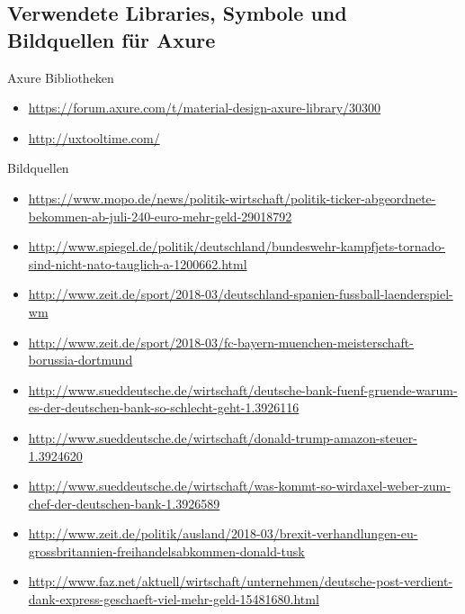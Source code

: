 \subsection{Verwendete Libraries, Symbole und Bildquellen für Axure}

Axure Bibliotheken

\begin{itemize}
  \sloppy

  \item \url{https://forum.axure.com/t/material-design-axure-library/30300}
  \item \url{http://uxtooltime.com/}

\end{itemize}

Bildquellen

\begin{itemize}
  \sloppy

  \item \url{https://www.mopo.de/news/politik-wirtschaft/politik-ticker-abgeordnete-bekommen-ab-juli-240-euro-mehr-geld-29018792}
  \item \url{http://www.spiegel.de/politik/deutschland/bundeswehr-kampfjets-tornado-sind-nicht-nato-tauglich-a-1200662.html}
  \item \url{http://www.zeit.de/sport/2018-03/deutschland-spanien-fussball-laenderspiel-wm}
  \item \url{http://www.zeit.de/sport/2018-03/fc-bayern-muenchen-meisterschaft-borussia-dortmund}
  \item \url{http://www.sueddeutsche.de/wirtschaft/deutsche-bank-fuenf-gruende-warum-es-der-deutschen-bank-so-schlecht-geht-1.3926116}
  \item \url{http://www.sueddeutsche.de/wirtschaft/donald-trump-amazon-steuer-1.3924620}
  \item \url{http://www.sueddeutsche.de/wirtschaft/was-kommt-so-wirdaxel-weber-zum-chef-der-deutschen-bank-1.3926589}
  \item \url{http://www.zeit.de/politik/ausland/2018-03/brexit-verhandlungen-eu-grossbritannien-freihandelsabkommen-donald-tusk}
  \item \url{http://www.faz.net/aktuell/wirtschaft/unternehmen/deutsche-post-verdient-dank-express-geschaeft-viel-mehr-geld-15481680.html}
\end{itemize}
